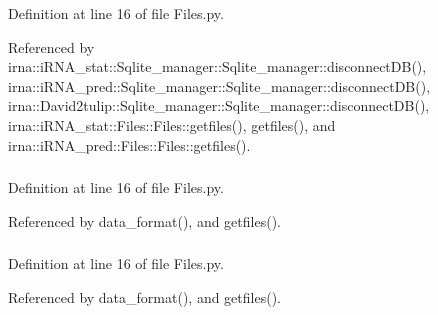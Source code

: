 \-Definition at line 16 of file \-Files.\-py.



\-Referenced by irna\-::i\-R\-N\-A\-\_\-stat\-::\-Sqlite\-\_\-manager\-::\-Sqlite\-\_\-manager\-::disconnect\-D\-B(), irna\-::i\-R\-N\-A\-\_\-pred\-::\-Sqlite\-\_\-manager\-::\-Sqlite\-\_\-manager\-::disconnect\-D\-B(), irna\-::\-David2tulip\-::\-Sqlite\-\_\-manager\-::\-Sqlite\-\_\-manager\-::disconnect\-D\-B(), irna\-::i\-R\-N\-A\-\_\-stat\-::\-Files\-::\-Files\-::getfiles(), getfiles(), and irna\-::i\-R\-N\-A\-\_\-pred\-::\-Files\-::\-Files\-::getfiles().

\hypertarget{classirna_1_1David2tulip_1_1Files_1_1Files_afba29f71e2f9fc83060e02b16f75161e}{
\subsubsection[{filter}]{}}
\label{classirna_1_1David2tulip_1_1Files_1_1Files_afba29f71e2f9fc83060e02b16f75161e}


\-Definition at line 16 of file \-Files.\-py.



\-Referenced by data\-\_\-format(), and getfiles().

\hypertarget{classirna_1_1David2tulip_1_1Files_1_1Files_abbd004852ce8d9ab8e288f302a2438bd}{
\subsubsection[{interact}]{}}
\label{classirna_1_1David2tulip_1_1Files_1_1Files_abbd004852ce8d9ab8e288f302a2438bd}


\-Definition at line 16 of file \-Files.\-py.



\-Referenced by data\-\_\-format(), and getfiles().

\hypertarget{classirna_1_1David2tulip_1_1Files_1_1Files_a6f550e6c30f3135b3436c14dc9798a05}{
\subsubsection[{i\-R\-N\-A\-\_\-db}]{}}
\label{classirna_1_1David2tulip_1_1Files_1_1Files_a6f550e6c30f3135b3436c14dc9798a05}



